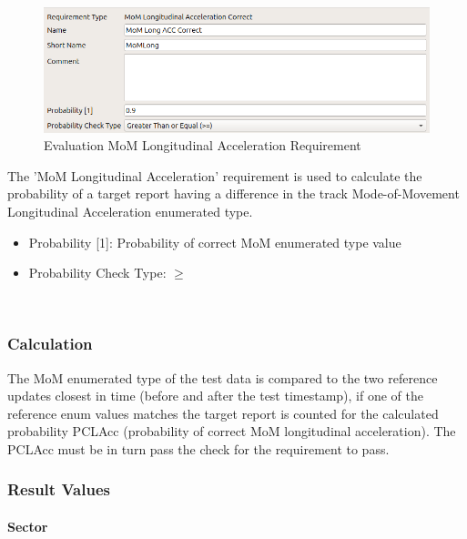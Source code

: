 \begin{figure}[H]
    \includegraphics[width=14cm,frame]{figures/eval_req_mom_long.png}
  \caption{Evaluation MoM Longitudinal Acceleration Requirement}
\end{figure}

The 'MoM Longitudinal Acceleration’ requirement is used to calculate the probability of a target report having a difference in the track Mode-of-Movement Longitudinal Acceleration enumerated type. 

\begin{itemize}  
\item Probability [1]: Probability of correct MoM enumerated type value
\item Probability Check Type: $\geq$
\end{itemize}
\ \\

\subsubsection{Calculation}

The MoM enumerated type of the test data is compared to the two reference updates closest in time (before and after the test timestamp), if one of the reference enum values matches the target report is counted for the calculated probability PCLAcc (probability of correct MoM longitudinal acceleration). The PCLAcc must be in turn pass the check for the requirement to pass. 

\subsubsection{Result Values}

\paragraph{Sector}

